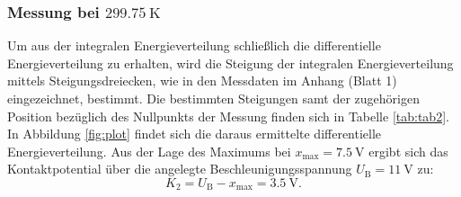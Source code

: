 \subsubsection{Messung bei $\SI{299.75}{\kelvin}$}
Um aus der integralen Energieverteilung schließlich die differentielle Energieverteilung zu erhalten, wird die Steigung der integralen Energieverteilung mittels Steigungsdreiecken, wie in den Messdaten im Anhang
(Blatt 1) eingezeichnet, bestimmt.
Die bestimmten Steigungen samt der zugehörigen Position bezüglich des Nullpunkts der Messung finden sich in Tabelle \ref{tab:tab2}.
In Abbildung \ref{fig:plot} findet sich die daraus ermittelte differentielle Energieverteilung. Aus der Lage des Maximums bei $x_{\mathrm{max}}=\SI{7.5}{\volt}$ ergibt sich das Kontaktpotential über die angelegte Beschleunigungsspannung $U_\mathrm{B}=\SI{11}{\volt}$ zu:
\begin{equation}
	K_2=U_\mathrm{B}-x_\mathrm{max}=\SI{3.5}{\volt} \text{.}
\end{equation}

